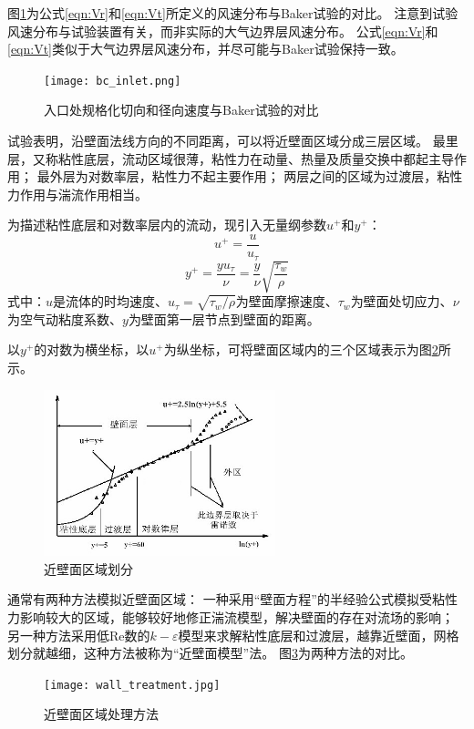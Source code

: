 图\ref{fig:bc-inlet}为公式\eqref{eqn:Vr}和\eqref{eqn:Vt}所定义的风速分布与Baker\cite{baker1981boundary}试验的对比。
注意到试验风速分布与试验装置有关，而非实际的大气边界层风速分布。
公式\eqref{eqn:Vr}和\eqref{eqn:Vt}类似于大气边界层风速分布，并尽可能与Baker\cite{baker1981boundary}试验保持一致。
\begin{figure}[!htbp]
	\centering
	\texttt{[image: bc\_inlet.png]}
	\caption{入口处规格化切向和径向速度与Baker\cite{baker1981boundary}试验的对比}
	\label{fig:bc-inlet}
\end{figure}

试验表明，沿壁面法线方向的不同距离，可以将近壁面区域分成三层区域。
最里层，又称粘性底层，流动区域很薄，粘性力在动量、热量及质量交换中都起主导作用；
最外层为对数率层，粘性力不起主要作用；
两层之间的区域为过渡层，粘性力作用与湍流作用相当。

为描述粘性底层和对数率层内的流动，现引入无量纲参数$u^{+}$和$y^{+}$：
\begin{equation}
	u^{+} = \frac{u}{u_{\tau}}
\end{equation}
\begin{equation}
	y^{+} = \frac{y u_{\tau}}{\nu} = \frac{y}{\nu} \sqrt{\frac{\tau_w}{\rho}}
\end{equation}
式中：$u$是流体的时均速度、$u_{\tau}=\sqrt{\tau_w/\rho}$为壁面摩擦速度、$\tau_w$为壁面处切应力、$\nu$为空气动粘度系数、$y$为壁面第一层节点到壁面的距离。

以$y^{+}$的对数为横坐标，以$u^{+}$为纵坐标，可将壁面区域内的三个区域表示为图\ref{fig:uplus}所示\cite{fluent2015theory}。
\begin{figure}[!htbp]
	\centering
	\includegraphics[width=0.6\textwidth]{figures/tornado/uplus.jpg}
	\caption{近壁面区域划分}\label{fig:uplus}
\end{figure}

通常有两种方法模拟近壁面区域：
一种采用“壁面方程”的半经验公式模拟受粘性力影响较大的区域，能够较好地修正湍流模型，解决壁面的存在对流场的影响；
另一种方法采用低$\mathrm{Re}$数的$k-\varepsilon$模型来求解粘性底层和过渡层，越靠近壁面，网格划分就越细，这种方法被称为“近壁面模型”法。
图\ref{fig:wall-treatment}为两种方法的对比\cite{fluent2015theory}。
\begin{figure}[!htbp]
	\centering
	\texttt{[image: wall\_treatment.jpg]}
	\caption{近壁面区域处理方法}
	\label{fig:wall-treatment}
\end{figure}

